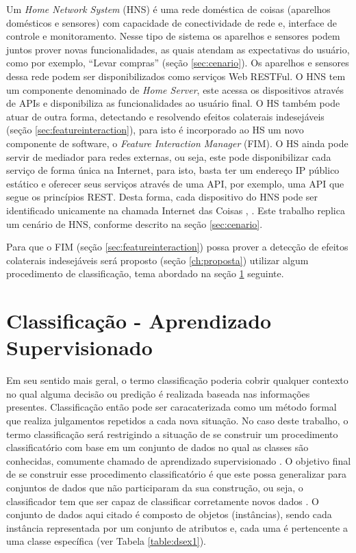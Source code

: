 Um \textit{Home Network System} (HNS) é uma rede doméstica de coisas (aparelhos domésticos e sensores) com capacidade de conectividade de rede e, interface de controle e monitoramento. Nesse tipo de sistema os aparelhos e sensores podem juntos prover novas funcionalidades, as quais atendam as expectativas do usuário, como por exemplo, ``Levar compras'' (seção \ref{sec:cenario}). Os aparelhos e sensores dessa rede podem ser disponibilizados como serviços Web RESTFul. O HNS tem um componente denominado de \textit{Home Server}, este acessa os dispositivos através de APIs e disponibiliza as funcionalidades ao usuário final. O HS também pode atuar de outra forma, detectando e resolvendo efeitos colaterais indesejáveis (seção \ref{sec:featureinteraction}), para isto é incorporado ao HS um novo componente de software, o \textit{Feature Interaction Manager} (FIM). O HS ainda pode servir de mediador para redes externas, ou seja, este pode disponibilizar cada serviço de forma única na Internet, para isto, basta ter um endereço IP público estático e oferecer seus serviços através de uma API, por exemplo, uma API que segue os princípios REST. Desta forma, cada dispositivo do HNS pode ser identificado unicamente na chamada Internet das Coisas \cite{Nakamura:2009}, \cite{Ikegami:2013}. Este trabalho replica um cenário de HNS, conforme descrito na seção \ref{sec:cenario}.

Para que o FIM (seção \ref{sec:featureinteraction}) possa prover a detecção de efeitos colaterais indesejáveis será proposto (seção \ref{ch:proposta}) utilizar algum procedimento de classificação, tema abordado na seção \ref{sec:classificacao} seguinte.

\section{Classificação - Aprendizado Supervisionado}
\label{sec:classificacao}
Em seu sentido mais geral, o termo classificação poderia cobrir qualquer contexto no qual alguma decisão ou predição é realizada baseada nas informações presentes. Classificação então pode ser caracaterizada como um método formal que realiza julgamentos repetidos a cada nova situação. No caso deste trabalho, o termo classificação será restrigindo a situação de se construir um procedimento classificatório com base em um conjunto de dados no qual as classes são conhecidas, comumente chamado de aprendizado supervisionado \cite{Michie:1994}. O objetivo final de se construir esse procedimento classificatório é que este possa generalizar para conjuntos de dados que não participaram da sua construção, ou seja, o classificador tem que ser capaz de classificar corretamente novos dados \cite{Kotsiantis:2007}. O conjunto de dados aqui citado é composto de objetos (instâncias), sendo cada instância representada por um conjunto de atributos e, cada uma é pertencente a uma classe específica (ver Tabela \ref{table:dsex1}).

